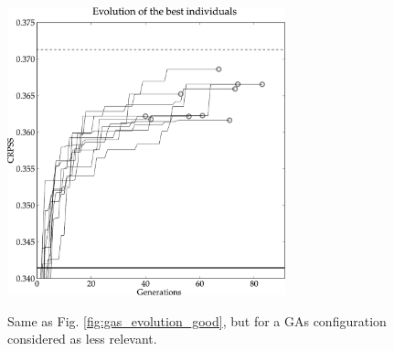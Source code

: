 \documentclass{ametsoc}
\begin{document}
\begin{figure}[t]
	\begin{center}
		\noindent\includegraphics[width=19pc,angle=0]{fig03.pdf}\\
	\end{center}
	\caption{Same as Fig. \ref{fig:gas_evolution_good}, but for a GAs configuration considered as less relevant.}
	\label{fig:gas_evolution_bad}
\end{figure}
\end{document}
